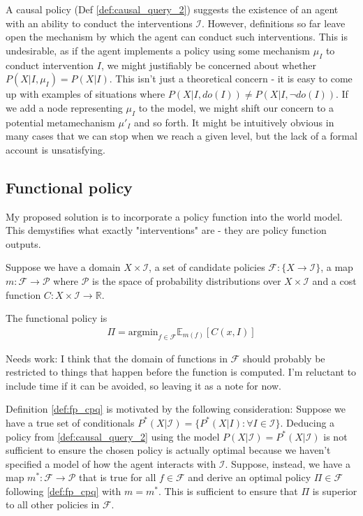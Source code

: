 A causal policy (Def \ref{def:causal_query_2}) suggests the existence of an agent with an ability to conduct the interventions $\mathcal{I}$. However, definitions so far leave open the mechanism by which the agent can conduct such interventions. This is undesirable, as if the agent implements a policy using some mechanism $\mu_I$ to conduct intervention $I$, we might justifiably be concerned about whether $P(X|I,\mu_I)=P(X|I)$. This isn't just a theoretical concern - it is easy to come up with examples of situations where $P(X|I,do(I))\neq P(X|I,\neg do(I))$. If we add a node representing $\mu_I$ to the model, we might shift our concern to a potential metamechanism $\mu'_I$ and so forth. It might be intuitively obvious in many cases that we can stop when we reach a given level, but the lack of a formal account is unsatisfying.

\subsection{Functional policy}

My proposed solution is to incorporate a policy function into the world model. This demystifies what exactly "interventions" are - they are policy function outputs.

\begin{definition}\label{def:fp_cpq}
Suppose we have a domain $X\times\mathcal{I}$, a set of candidate policies $\mathcal{F}:\{X\to \mathcal{I}\}$, a map $m:\mathcal{F}\to \mathcal{P}$ where $\mathcal{P}$ is the space of probability distributions over $X\times\mathcal{I}$ and a cost function $C:X\times\mathcal{I}\to \mathbb{R}$.

The functional policy is
\begin{align}
    \Pi=\mathrm{argmin}_{f\in\mathcal{F}}\mathbb{E}_{m(f)}[C(x,I)]    \label{eq:func_cp}
\end{align}
\end{definition}

Needs work: I think that the domain of functions in $\mathcal{F}$ should probably be restricted to things that happen before the function is computed. I'm reluctant to include time if it can be avoided, so leaving it as a note for now.

Definition \ref{def:fp_cpq} is motivated by the following consideration: Suppose we have a true set of conditionals $P^*(X|\mathcal{I})=\{P^*(X|I):\forall I \in \mathcal{I}\}$. Deducing a policy from \ref{def:causal_query_2} using the model $P(X|\mathcal{I})=P^*(X|\mathcal{I})$ is not sufficient to ensure the chosen policy is actually optimal because we haven't specified a model of how the agent interacts with $\mathcal{I}$. Suppose, instead, we have a map $m^*:\mathcal{F}\to\mathcal{P}$ that is true for all $f\in\mathcal{F}$ and derive an optimal policy $\Pi\in\mathcal{F}$ following \ref{def:fp_cpq} with $m=m^*$. This is sufficient to ensure that $\Pi$ is superior to all other policies in $\mathcal{F}$.

